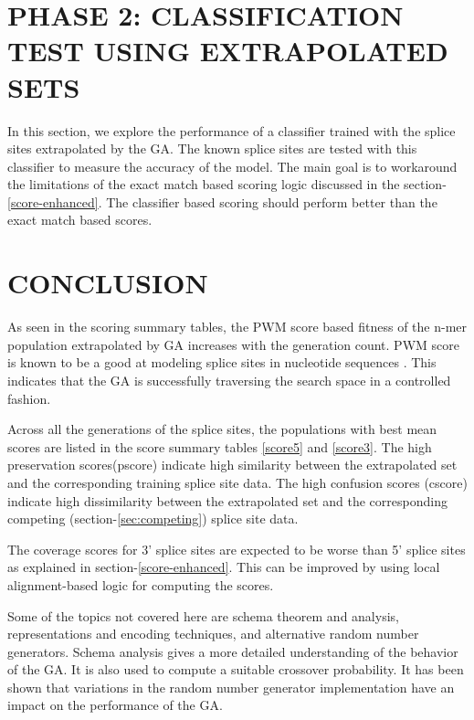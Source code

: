 \documentclass[12pt,a4paper]{article}
\begin{document}
	\section{PHASE 2: CLASSIFICATION TEST USING EXTRAPOLATED SETS}
	
	In this section, we explore the performance of a classifier trained with the splice sites extrapolated by the GA. The known splice sites are tested with this classifier to measure the accuracy of the model. The main goal is to workaround the limitations of the exact match based scoring logic discussed in the section-\ref{score-enhanced}. The classifier based scoring should perform better than the exact match based scores.
	
	

	\section{CONCLUSION}
	As seen in the scoring summary tables, the PWM score based fitness of the n-mer population extrapolated by GA increases with the generation count. PWM score is known to be a good at modeling splice sites in nucleotide sequences \cite{pwm-2}. This indicates that the GA is successfully traversing the search space in a controlled fashion. \par
	Across all the generations of the splice sites, the populations with best mean scores are listed in the score summary tables \ref{score5} and \ref{score3}. The high preservation scores(pscore) indicate high similarity between the extrapolated set and the corresponding training splice site data. The high confusion scores (cscore) indicate high dissimilarity between the extrapolated set and the corresponding competing (section-\ref{sec:competing}) splice site data. \par
	The coverage scores for 3' splice sites are expected to be worse than 5' splice sites as explained in section-\ref{score-enhanced}. This can be improved by using local alignment-based logic for computing the scores. \par
	Some of the topics not covered here are schema theorem and analysis, representations and encoding techniques, and alternative random number generators. Schema analysis gives a more detailed understanding of the behavior of the GA. It is also used to compute a suitable crossover probability. It has been shown that variations in the random number generator implementation have an impact on the performance of the GA. 
	
\end{document}
